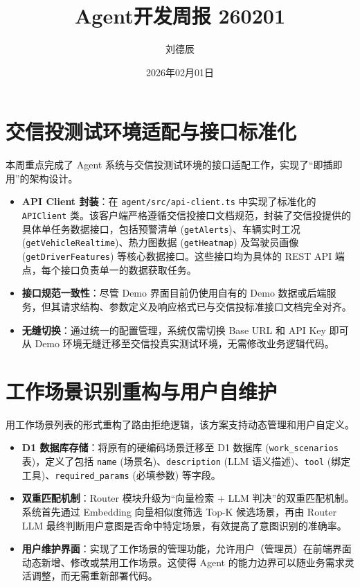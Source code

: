 \documentclass[UTF8]{ctexart}
\title{Agent开发周报 260201}
\author{刘德辰}
\date{2026年02月01日}
\begin{document}
\maketitle

\section{交信投测试环境适配与接口标准化}

本周重点完成了 Agent 系统与交信投测试环境的接口适配工作，实现了“即插即用”的架构设计。

\begin{itemize}
    \item \textbf{API Client 封装}：在 \texttt{agent/src/api-client.ts} 中实现了标准化的 \texttt{APIClient} 类。该客户端严格遵循交信投接口文档规范，封装了交信投提供的具体单任务数据接口，包括预警清单 (\texttt{getAlerts})、车辆实时工况 (\texttt{getVehicleRealtime})、热力图数据 (\texttt{getHeatmap}) 及驾驶员画像 (\texttt{getDriverFeatures}) 等核心数据接口。这些接口均为具体的 REST API 端点，每个接口负责单一的数据获取任务。
    \item \textbf{接口规范一致性}：尽管 Demo 界面目前仍使用自有的 Demo 数据或后端服务，但其请求结构、参数定义及响应格式已与交信投标准接口文档完全对齐。
    \item \textbf{无缝切换}：通过统一的配置管理，系统仅需切换 Base URL 和 API Key 即可从 Demo 环境无缝迁移至交信投真实测试环境，无需修改业务逻辑代码。
\end{itemize}

\section{工作场景识别重构与用户自维护}

用工作场景列表的形式重构了路由拒绝逻辑，该方案支持动态管理和用户自定义。

\begin{itemize}
    \item \textbf{D1 数据库存储}：将原有的硬编码场景迁移至 D1 数据库 (\texttt{work\_scenarios} 表)，定义了包括 \texttt{name} (场景名)、\texttt{description} (LLM 语义描述)、\texttt{tool} (绑定工具)、\texttt{required\_params} (必填参数) 等字段。
    \item \textbf{双重匹配机制}：Router 模块升级为“向量检索 + LLM 判决”的双重匹配机制。系统首先通过 Embedding 向量相似度筛选 Top-K 候选场景，再由 Router LLM 最终判断用户意图是否命中特定场景，有效提高了意图识别的准确率。
    \item \textbf{用户维护界面}：实现了工作场景的管理功能，允许用户（管理员）在前端界面动态新增、修改或禁用工作场景。这使得 Agent 的能力边界可以随业务需求灵活调整，而无需重新部署代码。
\end{itemize}
\end{document}
